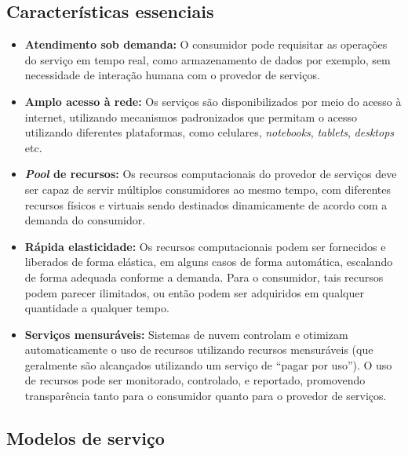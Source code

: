 \documentclass[
	12pt,				%
	openright,			%
	twoside,			%
	a4paper,			%
	english,			%
	french,				%
	spanish,			%
	brazil				%
	]{abntex2}
\begin{document}
\subsection{Características essenciais}
\begin{itemize}
	\item \textbf{Atendimento sob demanda:} O consumidor pode requisitar as operações do serviço em tempo real, como armazenamento de dados por exemplo, sem necessidade de interação humana com o provedor de serviços.
	\item \textbf{Amplo acesso à rede:} Os serviços são disponibilizados por meio do acesso à internet, utilizando mecanismos padronizados que permitam o acesso utilizando diferentes plataformas, como celulares, \emph{notebooks}, \emph{tablets}, \emph{desktops} etc.
	\item \textbf{\emph{Pool} de recursos:} Os recursos computacionais do provedor de serviços deve ser capaz de servir múltiplos consumidores ao mesmo tempo, com diferentes recursos físicos e virtuais sendo destinados dinamicamente de acordo com a demanda do consumidor.
	\item \textbf{Rápida elasticidade:} Os recursos computacionais podem ser fornecidos e liberados de forma elástica, em alguns casos de forma automática, escalando de forma adequada conforme a demanda. Para o consumidor, tais recursos podem parecer ilimitados, ou então podem ser adquiridos em qualquer quantidade a qualquer tempo.
	\item \textbf{Serviços mensuráveis:} Sistemas de nuvem controlam e otimizam automaticamente o uso de recursos utilizando recursos mensuráveis (que geralmente são alcançados utilizando um serviço de ``pagar por uso''). O uso de recursos pode ser monitorado, controlado, e reportado, promovendo transparência tanto para o consumidor quanto para o provedor de serviços.
\end{itemize}

\subsection{Modelos de serviço}
\end{document}
